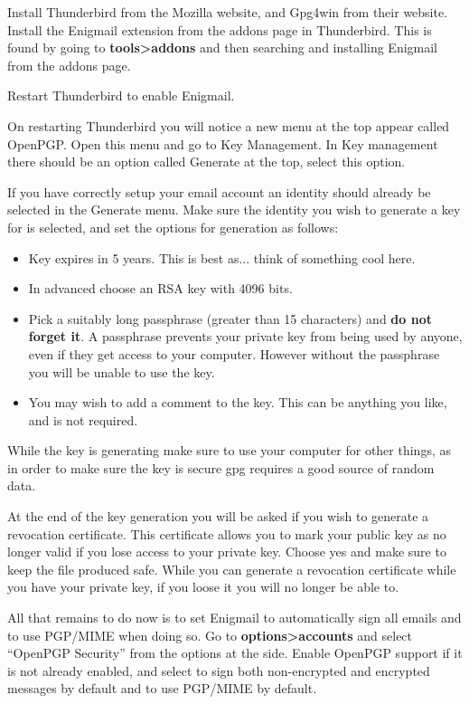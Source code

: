 \begin{compactenum}[1.]
    \item Install Thunderbird from the Mozilla website, and Gpg4win from their website. Install the Enigmail extension from the addons page in Thunderbird. This is found by going to \textbf{tools>addons} and then searching and installing Enigmail from the addons page.
    \item Restart Thunderbird to enable Enigmail.
    \item On restarting Thunderbird you will notice a new menu at the top appear called OpenPGP. Open this menu and go to Key Management. In Key management there should be an option called Generate at the top, select this option.
    \item If you have correctly setup your email account an identity should already be selected in the Generate menu. Make sure the identity you wish to generate a key for is selected, and set the options for generation as follows: 
        \begin{itemize}
            \item Key expires in 5 years. This is best as... think of something cool here.
            \item In advanced choose an RSA key with 4096 bits.
            \item Pick a suitably long passphrase (greater than 15 characters) and \textbf{do not forget it}. A passphrase prevents your private key from being used by anyone, even if they get access to your computer. However without the passphrase you will be unable to use the key.
            \item You may wish to add a comment to the key. This can be anything you like, and is not required.
        \end{itemize}
    \item While the key is generating make sure to use your computer for other things, as in order to make sure the key is secure gpg requires a good source of random data.
    \item At the end of the key generation you will be asked if you wish to generate a revocation certificate. This certificate allows you to mark your public key as no longer valid if you lose access to your private key. Choose yes and make sure to keep the file produced safe. While you can generate a revocation certificate while you have your private key, if you loose it you will no longer be able to.
    \item All that remains to do now is to set Enigmail to automatically sign all emails and to use PGP/MIME when doing so. Go to \textbf{options>accounts} and select ``OpenPGP Security'' from the options at the side. Enable OpenPGP support if it is not already enabled, and select to sign both non-encrypted and encrypted messages by default and to use PGP/MIME by default.

\end{compactenum}

